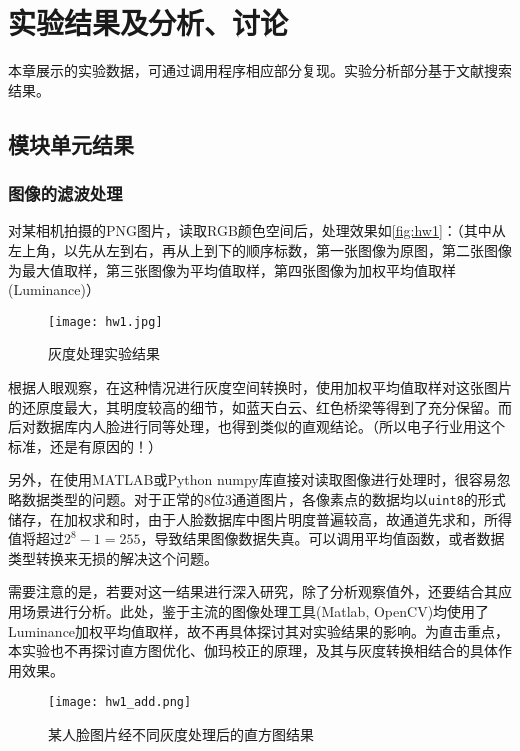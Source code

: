 \chapter{实验结果及分析、讨论}
\label{cha:re}

本章展示的实验数据，可通过调用程序相应部分复现。实验分析部分基于文献搜索结果。

\section{模块单元结果}

\subsection{图像的滤波处理}

对某相机拍摄的PNG图片，读取RGB颜色空间后，处理效果如\autoref{fig:hw1}：（其中从左上角，以先从左到右，再从上到下的顺序标数，第一张图像为原图，第二张图像为最大值取样，第三张图像为平均值取样，第四张图像为加权平均值取样(Luminance)）

\begin{figure}[H]
    \centering
    \texttt{[image: hw1.jpg]}
    \caption{灰度处理实验结果}
    \label{fig:hw1}
\end{figure}

根据人眼观察，在这种情况进行灰度空间转换时，使用加权平均值取样对这张图片的还原度最大，其明度较高的细节，如蓝天白云、红色桥梁等得到了充分保留。而后对数据库内人脸进行同等处理，也得到类似的直观结论。（所以电子行业用这个标准，还是有原因的！）

另外，在使用MATLAB或Python numpy库直接对读取图像进行处理时，很容易忽略数据类型的问题。对于正常的8位3通道图片，各像素点的数据均以\verb|uint8|的形式储存，在加权求和时，由于人脸数据库中图片明度普遍较高，故通道先求和，所得值将超过$2^8-1=255$，导致结果图像数据失真。可以调用平均值函数，或者数据类型转换来无损的解决这个问题。

需要注意的是，若要对这一结果进行深入研究，除了分析观察值外，还要结合其应用场景进行分析。此处，鉴于主流的图像处理工具(Matlab, OpenCV)均使用了Luminance加权平均值取样，故不再具体探讨其对实验结果的影响。为直击重点，本实验也不再探讨直方图优化、伽玛校正的原理，及其与灰度转换相结合的具体作用效果。

\begin{figure}[H]
    \centering
    \texttt{[image: hw1\_add.png]}
    \caption{某人脸图片经不同灰度处理后的直方图结果}
    \label{fig:hw1_add}
\end{figure}


